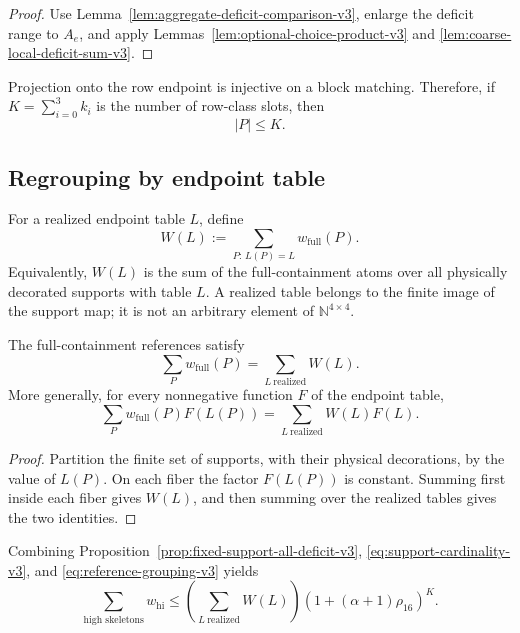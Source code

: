 \begin{proof}
Use Lemma~\ref{lem:aggregate-deficit-comparison-v3}, enlarge the deficit range
to $A_e$, and apply Lemmas~\ref{lem:optional-choice-product-v3} and
\ref{lem:coarse-local-deficit-sum-v3}.
\end{proof}

Projection onto the row endpoint is injective on a block matching. Therefore,
if $K=\sum_{i=0}^{3}k_i$ is the number of row-class slots, then
\begin{equation}
  |P|\le K.
  \label{eq:support-cardinality-v3}
\end{equation}

\subsection{Regrouping by endpoint table}

For a realized endpoint table $L$, define
\[
  W(L)
  :=
  \sum_{P:\,L(P)=L}w_{\mathrm{full}}(P).
\]
Equivalently, $W(L)$ is the sum of the full-containment atoms over all
physically decorated supports with table $L$. A realized table belongs to the
finite image of the support map; it is not an arbitrary element of
$\mathbb N^{4\times4}$.

\begin{proposition}
\label{prop:reference-grouping-v3}
The full-containment references satisfy
\begin{equation}
  \sum_P w_{\mathrm{full}}(P)
  =
  \sum_{L\ \mathrm{realized}}W(L).
  \label{eq:reference-grouping-v3}
\end{equation}
More generally, for every nonnegative function $F$ of the endpoint table,
\begin{equation}
  \sum_P w_{\mathrm{full}}(P)F(L(P))
  =
  \sum_{L\ \mathrm{realized}}W(L)F(L).
  \label{eq:weighted-reference-grouping-v3}
\end{equation}
\end{proposition}

\begin{proof}
Partition the finite set of supports, with their physical decorations, by the
value of $L(P)$. On each fiber the factor $F(L(P))$ is constant. Summing first
inside each fiber gives $W(L)$, and then summing over the realized tables gives
the two identities.
\end{proof}

Combining Proposition~\ref{prop:fixed-support-all-deficit-v3},
\eqref{eq:support-cardinality-v3}, and
\eqref{eq:reference-grouping-v3} yields
\begin{equation}
  \sum_{\text{high skeletons}}w_{\mathrm{hi}}
  \le
  \left(\sum_{L\ \mathrm{realized}}W(L)\right)
  \left(1+(\alpha+1)\rho_{16}\right)^K.
  \label{eq:coarse-realized-table-reduction-v3}
\end{equation}

